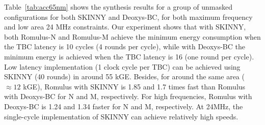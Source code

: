 \documentclass[conference]{IEEEtran}
\begin{document}
Table~\ref{tab:acc65nm} shows the synthesis results for a group of unmasked configurations for both SKINNY and Deoxys-BC, for both maximum frequency and low area 24 MHz constraints. Our experiment shows that with SKINNY, both Romulus-N and Romulus-M achieve the minimum energy consumption when the TBC latency is 10 cycles (4 rounds per cycle), while with Deoxys-BC the minimum energy is achieved when the TBC latency is 16 (one round per cycle). Low latency implementation (1 clock cycle per TBC) can be achieved using SKINNY (40 rounds) in around 55 kGE. Besides, for around the same area ($\approx 12$ kGE), Romulus with SKINNY is 1.85 and 1.7 times fast than Romulus with Deoxys-BC for N and M, respectively. For high frequencies, Romulus with Deoxys-BC is 1.24 and 1.34 faster for N and M, respectively. At 24MHz, the single-cycle implementation of SKINNY can achieve relatively high speeds.
\end{document}
